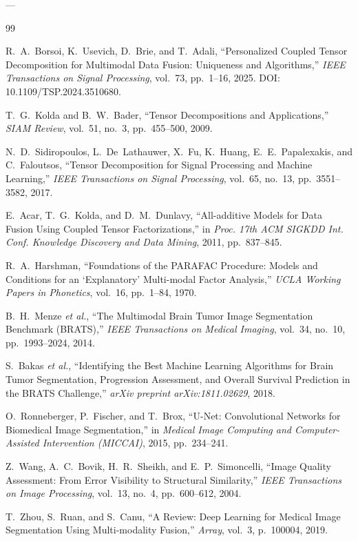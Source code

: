 \documentclass[11pt,a4paper]{article}
\begin{document}
---

\begin{thebibliography}{99}

R.~A.~Borsoi, K.~Usevich, D.~Brie, and T.~Adali,
``Personalized Coupled Tensor Decomposition for Multimodal Data Fusion: Uniqueness and Algorithms,''
\emph{IEEE Transactions on Signal Processing}, vol.~73, pp.~1--16, 2025. 
DOI: 10.1109/TSP.2024.3510680.

T.~G.~Kolda and B.~W.~Bader,
``Tensor Decompositions and Applications,''
\emph{SIAM Review}, vol.~51, no.~3, pp.~455--500, 2009.

N.~D.~Sidiropoulos, L.~De~Lathauwer, X.~Fu, K.~Huang, E.~E.~Papalexakis, and C.~Faloutsos,
``Tensor Decomposition for Signal Processing and Machine Learning,''
\emph{IEEE Transactions on Signal Processing}, vol.~65, no.~13, pp.~3551--3582, 2017.

E.~Acar, T.~G.~Kolda, and D.~M.~Dunlavy,
``All-additive Models for Data Fusion Using Coupled Tensor Factorizations,''
in \emph{Proc. 17th ACM SIGKDD Int. Conf. Knowledge Discovery and Data Mining}, 2011, pp.~837--845.

R.~A.~Harshman,
``Foundations of the PARAFAC Procedure: Models and Conditions for an `Explanatory' Multi-modal Factor Analysis,''
\emph{UCLA Working Papers in Phonetics}, vol.~16, pp.~1--84, 1970.

B.~H.~Menze \emph{et al.},
``The Multimodal Brain Tumor Image Segmentation Benchmark (BRATS),''
\emph{IEEE Transactions on Medical Imaging}, vol.~34, no.~10, pp.~1993--2024, 2014.

S.~Bakas \emph{et al.},
``Identifying the Best Machine Learning Algorithms for Brain Tumor Segmentation, Progression Assessment, and Overall Survival Prediction in the BRATS Challenge,''
\emph{arXiv preprint arXiv:1811.02629}, 2018.

O.~Ronneberger, P.~Fischer, and T.~Brox,
``U-Net: Convolutional Networks for Biomedical Image Segmentation,''
in \emph{Medical Image Computing and Computer-Assisted Intervention (MICCAI)}, 2015, pp.~234--241.

Z.~Wang, A.~C.~Bovik, H.~R.~Sheikh, and E.~P.~Simoncelli,
``Image Quality Assessment: From Error Visibility to Structural Similarity,''
\emph{IEEE Transactions on Image Processing}, vol.~13, no.~4, pp.~600--612, 2004.

T.~Zhou, S.~Ruan, and S.~Canu,
``A Review: Deep Learning for Medical Image Segmentation Using Multi-modality Fusion,''
\emph{Array}, vol.~3, p.~100004, 2019.

\end{thebibliography}
\end{document}
